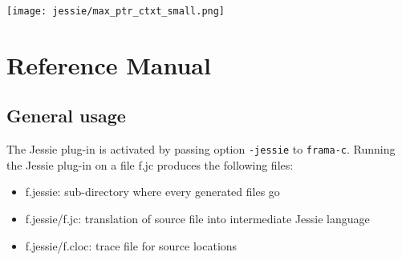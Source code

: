 \documentclass[a4paper,11pt,twoside,openright]{report}
\begin{document}
\begin{center}
  \texttt{[image: jessie/max\_ptr\_ctxt\_small.png]}
\end{center}



% 


% 


% 


\chapter{Reference Manual}

\section{General usage}

The Jessie plug-in is activated by passing option
\verb|-jessie| to \verb|frama-c|. Running the Jessie plug-in
on a file f.jc produces the following files:

\begin{itemize}
\item f.jessie: sub-directory where every generated files go
\item f.jessie/f.jc: translation of source file into intermediate Jessie language
\item f.jessie/f.cloc: trace file for source locations
\end{itemize}
\end{document}

